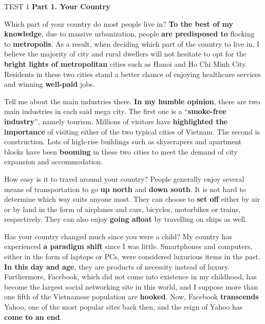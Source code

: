 \begin{glossarymc}[Cambridge 5]
    \begin{test}{TEST 1}
    \noindent
    \textbf{Part 1. Your Country}
        \begin{qa}{Which part of your country do most people live in?}
        \textbf{To the best of my knowledge}, due to massive urbanization, people \textbf{are predisposed to} flocking to \textbf{metropolis}. As a result, when deciding which part of the country to live in, I believe the majority of city and rural dwellers will not hesitate to opt for the \textbf{bright lights of metropolitan} cities such as Hanoi and Ho Chi Minh City. Residents in these two cities stand a better chance of enjoying healthcare services and winning \textbf{well-paid} jobs.
        \end{qa}

        \begin{qa}{Tell me about the main industries there.}
        \textbf{In my humble opinion}, there are two main industries in each said mega city. The first one is a “\textbf{smoke-free industry}”, namely tourism. Millions of visitors have \textbf{highlighted the importance} of visiting either of the two typical cities of Vietnam. The second is construction. Lots of high-rise buildings such as skyscrapers and apartment blocks have been \textbf{booming} in these two cities to meet the demand of city expansion and accommodation.
        \end{qa}

        \begin{qa}{How easy is it to travel around your country?}
        People generally enjoy several means of transportation to go \textbf{up north} and \textbf{down south}. It is not hard to determine which way suits anyone most. They can choose to \textbf{set off} either by air or by land in the form of airplanes and cars, bicycles, motorbikes or trains, respectively. They can also enjoy \textbf{going afloat} by travelling on ships as well.
        \end{qa}

        \begin{qa}{Has your country changed much since you were a child?}
        My country has experienced \textbf{a paradigm shift} since I was little. Smartphones and computers, either in the form of laptops or PCs, were considered luxurious items in the past. \textbf{In this day and age}, they are products of necessity instead of luxury. Furthermore, Facebook, which did not come into existence in my childhood, has become the largest social networking site in this world, and I suppose more than one fifth of the Vietnamese population are \textbf{hooked}. Now, Facebook \textbf{transcends} Yahoo, one of the most popular sites back then, and the reign of Yahoo has \textbf{come to an end}.
        \end{qa}


\end{test}
\end{glossarymc}
